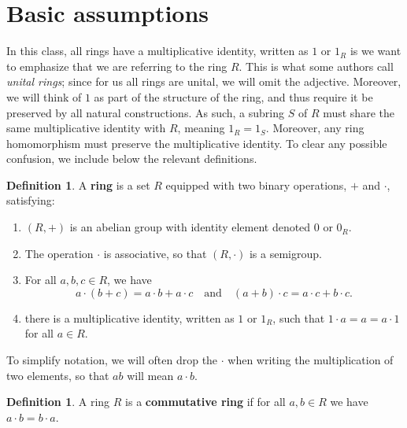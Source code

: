 \documentclass[12pt]{report}
\numberwithin{equation}{section}
\numberwithin{theorem}{chapter}
\theoremstyle{definition}
\newtheorem{definition}[theorem]{Definition}
\newtheorem*{basic properties}{Basic Properties}
\newtheorem*{Important Remark}{Important Remark}
\newcommand{\df}[1]{{\bf #1}\index{#1}}
\begin{document}
\section{Basic assumptions}

In this class, all rings have a multiplicative identity, written as $1$ or $1_R$ is we want to emphasize that we are referring to the ring $R$. This is what some authors call \emph{unital rings}; since for us all rings are unital, we will omit the adjective. Moreover, we will think of $1$ as part of the structure of the ring, and thus require it be preserved by all natural constructions. As such, a subring $S$ of $R$ must share the same multiplicative identity with $R$, meaning $1_R = 1_S$. Moreover, any ring homomorphism must preserve the multiplicative identity. To clear any possible confusion, we include below the relevant definitions.

\begin{definition}
A \df{ring} is a set $R$ equipped with two binary operations, $+$ and $\cdot$, satisfying:
\begin{enumerate}[itemsep=0pt,label=(\arabic*)]
\item $(R,+)$ is an abelian group with identity element denoted $0$ or $0_R$.
\item The operation $\cdot$ is associative, so that $(R,\cdot)$ is a semigroup.
\item For all $a,b,c \in R$, we have
$$a \cdot (b + c) = a \cdot b + a \cdot c \quad \textrm{and} \quad (a + b) \cdot c = a \cdot c + b \cdot c.$$
\item there is a multiplicative identity, written as $1$ or $1_R$, such that $1 \cdot a = a = a \cdot 1$ for all $a \in R$.
\end{enumerate}
\end{definition}

To simplify notation, we will often drop the $\cdot$ when writing the multiplication of two elements, so that $ab$ will mean $a \cdot b$.


\begin{definition}
A ring $R$ is a \df{commutative ring} if for all $a,b \in R$ we have $a \cdot b = b \cdot a$.
\end{definition}
\end{document}
